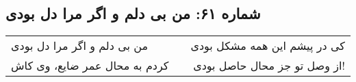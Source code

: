 \begin{center}
\section*{شماره ۶۱: من بی دلم و اگر مرا دل بودی}
\label{sec:061}
\begin{longtable}{l p{0.5cm} r}
من بی دلم و اگر مرا دل بودی
&&
کی در پیشم این همه مشکل بودی
\\
کردم به محال عمر ضایع، وی کاش
&&
از وصل تو جز محال حاصل بودی!
\\
\end{longtable}
\end{center}
